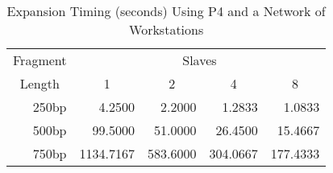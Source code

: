 \begin{table}[bth]
\caption{Expansion Timing (seconds) Using P4 and a Network of Workstations}
\label{'p41'}
\begin{center}
\begin{tabular}{||r|rrrr||}  \hline
\multicolumn{1}{||c|}{Fragment} & \multicolumn{4}{c||}{Slaves} \\ 
\multicolumn{1}{||c|}{Length} & \multicolumn{1}{c}{1} & \multicolumn{1}{c}{2} &
\multicolumn{1}{c}{4} & \multicolumn{1}{c||}{8} \\ \hline
250bp &    4.2500 &   2.2000 &   1.2833 &   1.0833 \\
500bp &   99.5000 &  51.0000 &  26.4500 &  15.4667 \\
750bp & 1134.7167 & 583.6000 & 304.0667 & 177.4333 \\ \hline
\end{tabular}
\end{center}
\end{table}
